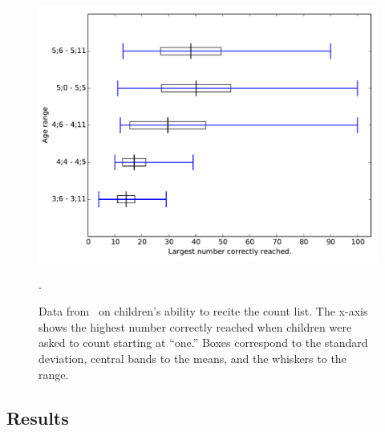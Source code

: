 \documentclass[10pt,letterpaper]{article}
\begin{document}
\begin{figure}[t]
\includegraphics[width=\linewidth]{figures/fuson_table}
\caption{Data from~\citet{FusRicBriar1982} on children's ability to
  recite the count list. The x-axis shows the highest number correctly
  reached when children were asked to count starting at ``one.'' Boxes
  correspond to the standard deviation, central bands to the means,
  and the whiskers to the range.
\label{fig:fuson_count_data}}. 
\end{figure}


\subsection{Results}
\end{document}
